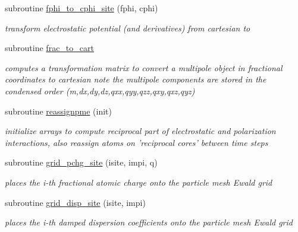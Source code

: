 \begin{DoxyCompactItemize}
subroutine \hyperlink{pmestuff_8f90_acac006e94420d1c20f607ffcc78de99d}{fphi\-\_\-to\-\_\-cphi\-\_\-site} (fphi, cphi)
\begin{DoxyCompactList}\small\item\em transform electrostatic potential (and derivatives) from cartesian to \end{DoxyCompactList}\item 
subroutine \hyperlink{pmestuff_8f90_a1350ef38c71785ec4079a23e4cb7c9ca}{frac\-\_\-to\-\_\-cart}
\begin{DoxyCompactList}\small\item\em computes a transformation matrix to convert a multipole object in fractional coordinates to cartesian note the multipole components are stored in the condensed order (m,dx,dy,dz,qxx,qyy,qzz,qxy,qxz,qyz) \end{DoxyCompactList}\item 
subroutine \hyperlink{pmestuff_8f90_a678ca0cec4d103cb489a1ef6dfbe5fe3}{reassignpme} (init)
\begin{DoxyCompactList}\small\item\em initialize arrays to compute reciprocal part of electrostatic and polarization interactions, also reassign atoms on 'reciprocal cores' between time steps \end{DoxyCompactList}\item 
subroutine \hyperlink{pmestuff_8f90_add1c28a3b5a4b53264960d7fb9231164}{grid\-\_\-pchg\-\_\-site} (isite, impi, q)
\begin{DoxyCompactList}\small\item\em places the i-\/th fractional atomic charge onto the particle mesh Ewald grid \end{DoxyCompactList}\item 
subroutine \hyperlink{pmestuff_8f90_a0b37f12d67a29828eeb0566a84e761fa}{grid\-\_\-disp\-\_\-site} (isite, impi)
\begin{DoxyCompactList}\small\item\em places the i-\/th damped dispersion coefficients onto the particle mesh Ewald grid \end{DoxyCompactList}\end{DoxyCompactItemize}


